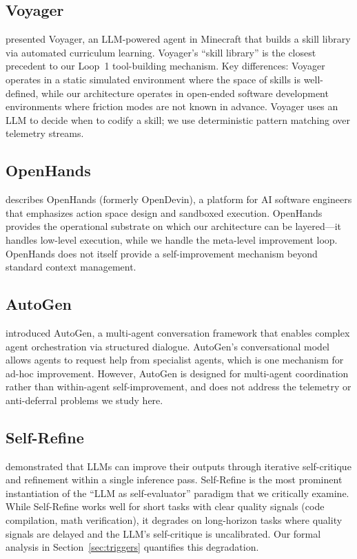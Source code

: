\subsection{Voyager}

\cite{wang2023voyager} presented Voyager, an LLM-powered agent in Minecraft
that builds a skill library via automated curriculum learning. Voyager's
``skill library'' is the closest precedent to our Loop~1 tool-building mechanism.
Key differences: Voyager operates in a static simulated environment where the
space of skills is well-defined, while our architecture operates in open-ended
software development environments where friction modes are not known in advance.
Voyager uses an LLM to decide when to codify a skill; we use deterministic
pattern matching over telemetry streams.

\subsection{OpenHands}

\cite{wang2024openhands} describes OpenHands (formerly OpenDevin), a platform
for AI software engineers that emphasizes action space design and sandboxed
execution. OpenHands provides the operational substrate on which our architecture
can be layered---it handles low-level execution, while we handle the
meta-level improvement loop. OpenHands does not itself provide a self-improvement
mechanism beyond standard context management.

\subsection{AutoGen}

\cite{wu2023autogen} introduced AutoGen, a multi-agent conversation framework
that enables complex agent orchestration via structured dialogue. AutoGen's
conversational model allows agents to request help from specialist agents,
which is one mechanism for ad-hoc improvement. However, AutoGen is designed
for multi-agent coordination rather than within-agent self-improvement, and
does not address the telemetry or anti-deferral problems we study here.

\subsection{Self-Refine}

\cite{madaan2023selfrefine} demonstrated that LLMs can improve their outputs
through iterative self-critique and refinement within a single inference
pass. Self-Refine is the most prominent instantiation of the ``LLM as
self-evaluator'' paradigm that we critically examine. While Self-Refine works
well for short tasks with clear quality signals (code compilation, math
verification), it degrades on long-horizon tasks where quality signals are
delayed and the LLM's self-critique is uncalibrated. Our formal analysis in
Section~\ref{sec:triggers} quantifies this degradation.

